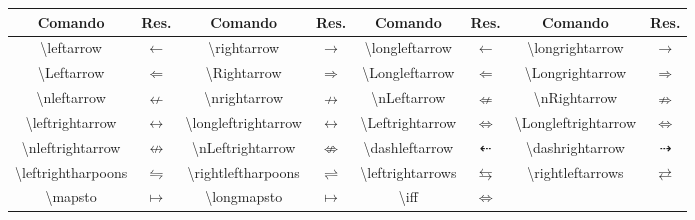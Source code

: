 % 
% 
% 
% 
% 
\begin{tabular}{cc|cc|cc|cc}
    \hline
    Comando & Res. & Comando & Res. & Comando & Res. & Comando & Res. \\ \hline
    \textbackslash\textsf{leftarrow} & $\leftarrow$ & \textbackslash\textsf{rightarrow} & $\rightarrow$ & \textbackslash\textsf{longleftarrow} & $\longleftarrow$ & \textbackslash\textsf{longrightarrow} & $\longrightarrow$ \\
    \textbackslash\textsf{Leftarrow} & $\Leftarrow$ & \textbackslash\textsf{Rightarrow} & $\Rightarrow$ & \textbackslash\textsf{Longleftarrow} & $\Longleftarrow$ & \textbackslash\textsf{Longrightarrow} & $\Longrightarrow$ \\
    \textbackslash\textsf{nleftarrow} & $\nleftarrow$ & \textbackslash\textsf{nrightarrow} & $\nrightarrow$ & \textbackslash\textsf{nLeftarrow} & $\nLeftarrow$ & \textbackslash\textsf{nRightarrow} & $\nRightarrow$ \\
    \textbackslash\textsf{leftrightarrow} & $\leftrightarrow$ & \textbackslash\textsf{longleftrightarrow} & $\longleftrightarrow$ & \textbackslash\textsf{Leftrightarrow} & $\Leftrightarrow$ & \textbackslash\textsf{Longleftrightarrow} & $\Longleftrightarrow$ \\
    \textbackslash\textsf{nleftrightarrow} & $\nleftrightarrow$ & \textbackslash\textsf{nLeftrightarrow} & $\nLeftrightarrow$ & \textbackslash\textsf{dashleftarrow} & $\dashleftarrow$ & \textbackslash\textsf{dashrightarrow} & $\dashrightarrow$ \\
    \textbackslash\textsf{leftrightharpoons} & $\leftrightharpoons$ & \textbackslash\textsf{rightleftharpoons} & $\rightleftharpoons$ & \textbackslash\textsf{leftrightarrows} & $\leftrightarrows$ & \textbackslash\textsf{rightleftarrows} & $\rightleftarrows$ \\
    \textbackslash\textsf{mapsto} & $\mapsto$ & \textbackslash\textsf{longmapsto} & $\longmapsto$ & \textbackslash\textsf{iff} & $\iff$ & &  \\

\end{tabular}
